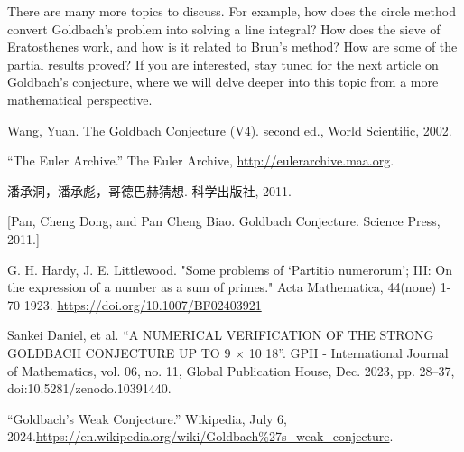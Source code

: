 \documentclass{article}
\begin{document}
There are many more topics to discuss. For example, how does the circle method convert Goldbach's problem into solving a line integral? How does the sieve of Eratosthenes work, and how is it related to Brun's method? How are some of the partial results proved? If you are interested, stay tuned for the next article on Goldbach's conjecture, where we will delve deeper into this topic from a more mathematical perspective.
\begin{thebibliography}{9}
Wang, Yuan. The Goldbach Conjecture (V4). second ed., World Scientific, 2002. 

“The Euler Archive.” The Euler Archive, \url{http://eulerarchive.maa.org}.

\begin{CJK*}{UTF8}{gbsn}潘承洞，潘承彪，哥德巴赫猜想. 科学出版社, 2011.\end{CJK*} [Pan, Cheng Dong, and Pan Cheng Biao. Goldbach Conjecture. Science Press, 2011.]

G. H. Hardy, J. E. Littlewood. "Some problems of ‘Partitio numerorum’; III: On the expression of a number as
a sum of primes." Acta Mathematica, 44(none) 1-70 1923.
\url{https://doi.org/10.1007/BF02403921}

Sankei Daniel, et al. “A NUMERICAL VERIFICATION OF THE STRONG GOLDBACH CONJECTURE UP TO 9 × 10 18”. GPH - International Journal of Mathematics, vol. 06, no. 11, Global Publication House, Dec. 2023, pp. 28–37, doi:10.5281/zenodo.10391440.

“Goldbach’s Weak Conjecture.” Wikipedia, July 6, 2024.\url{https://en.wikipedia.org/wiki/Goldbach%27s_weak_conjecture}. 
\end{thebibliography}
\end{document}
